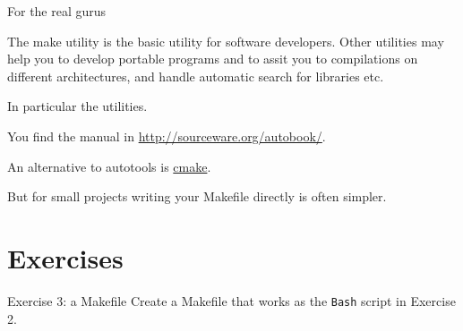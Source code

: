 \documentclass[10pt,aspectratio=169]{beamer}
\newcommand{\red}{\color{red}}
\begin{document}
\begin{frame}{For the real gurus}

The make utility is the basic utility for software developers. Other
utilities may help you to develop portable programs and to assit you to
compilations on different architectures, and handle automatic search for libraries etc.
\smallskip


In particular the \red{autotools} utilities. 

You find the manual in 
\href{http://sourceware.org/autobook/}{http://sourceware.org/autobook/}.
\smallskip

An alternative to autotools is \href{https://cmake.org/}{cmake}.
\medskip

But for small projects writing your Makefile directly is often simpler.
\end{frame}

\section*{Exercises}
\begin{frame}{Exercise 3: a Makefile}
  Create a Makefile that works as the \texttt{Bash} script in Exercise 2.
\end{frame}
\end{document}

